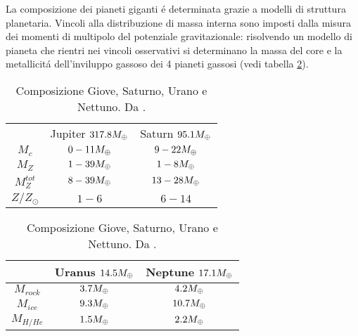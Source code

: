 La composizione dei pianeti giganti \'e determinata grazie a modelli di struttura planetaria. Vincoli alla distribuzione di massa interna sono imposti dalla misura dei momenti di multipolo del potenziale gravitazionale: risolvendo un modello di pianeta che rientri nei vincoli osservativi si determinano la massa del core e la metallicit\'a dell'inviluppo gassoso dei 4 pianeti gassosi (vedi  tabella \ref{tab:JSUNcomp}).

\begin{table}[!htb]
    \begin{minipage}{.5\linewidth}
      \centering
        \begin{tabular}{|ccc|}
\hline
&\parbox{1.5cm}{Jupiter $317.8M_{\oplus}{}$}&\parbox{1.5cm}{Saturn $95.1M_{\oplus}{}$}\\
  $M_c$&$0-11M_{\oplus}{}$&$9-22M_{\oplus}{}$\\
\hline
$M_Z$&$1-39M_{\oplus}{}$&$1-8M_{\oplus}{}$\\
\hline
$M_Z^{tot}$&$8-39M_{\oplus}{}$&$13-28M_{\oplus}{}$\\
\hline
$Z/Z_{\odot}$&$1-6$&$6-14$\\
\hline
 \end{tabular}
    \end{minipage}%
    \begin{minipage}{.5\linewidth}
      \centering
        \begin{tabular}{|ccc|}
\hline
&\parbox{1.5cm}{Uranus $14.5M_{\oplus}{}$}&\parbox{1.5cm}{Neptune $17.1M_{\oplus}{}$}\\
\hline
$M_{rock}$&$3.7M_{\oplus}{}$&$4.2M_{\oplus}{}$\\
\hline
$M_{ice}$&$9.3M_{\oplus}{}$&$10.7M_{\oplus}{}$\\
\hline
$M_{H/He}$&$1.5M_{\oplus}{}$&$2.2M_{\oplus}{}$\\
\hline
        \end{tabular}
    \end{minipage} 
    \caption{Composizione Giove, Saturno, Urano e Nettuno. Da \cite{baraffe2009physical}.}\label{tab:JSUNcomp}
\end{table}

